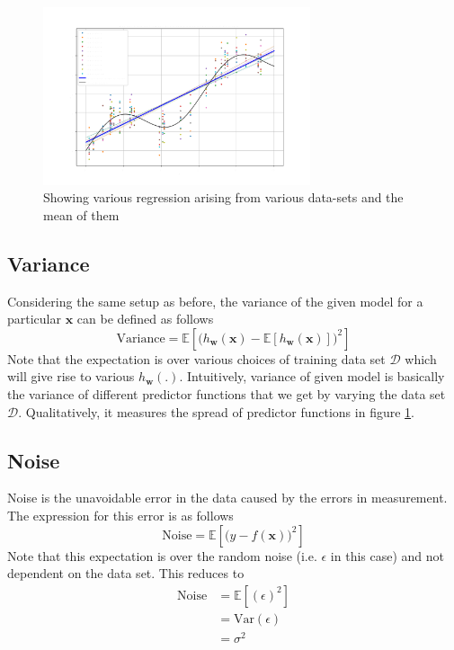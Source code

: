 \documentclass{report}
\newcommand{\w}{\mathbf{w}} %
\newcommand{\x}{\mathbf{x}}
\begin{document}
\begin{figure}[H]
  \centerline{\includegraphics[width = 0.7\textwidth]{images/13.png}}
  \caption{Showing various regression arising from various data-sets and the mean of them}
  \label{fig}
\end{figure}

\subsection{Variance}

Considering the same setup as before, the variance of the given model for a particular \(\x\) can be defined as follows
\begin{equation}
  \text{Variance} = \mathbb{E}\left[\bigl(h_\w(\x)-\mathbb{E}\left[h_\w(\x)\right]\bigr)^2\right]
\end{equation}
Note that the expectation is over various choices of training data set \(\mathcal{D}\) which will give rise to various \(h_\w(.)\). Intuitively, variance of given model is basically the variance of different predictor functions that we get by varying the data set \(\mathcal{D}\). Qualitatively, it measures the spread of predictor functions in figure \ref{fig}.

\subsection{Noise}

Noise is the unavoidable error in the data caused by the errors in measurement. The expression for this error is as follows
\begin{equation}
  \text{Noise} = \mathbb{E}\left[\bigl(y-f(\x)\bigr)^2\right]
\end{equation}
Note that this expectation is over the random noise (i.e. $\epsilon$ in this case) and not dependent on the data set. This reduces to
\begin{align*}
  \text{Noise} & = \mathbb{E}\left[(\epsilon)^2\right] \\
               & = \text{Var}(\epsilon)                \\
               & = \sigma^2
\end{align*}
\end{document}
